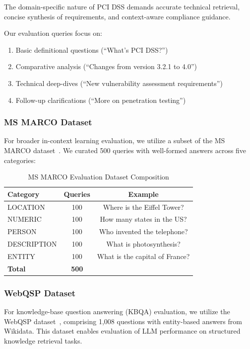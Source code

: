 The domain-specific nature of PCI DSS demands accurate technical retrieval, concise synthesis of requirements, and context-aware compliance guidance.

Our evaluation queries focus on:
\begin{enumerate}[leftmargin=*]
    \item Basic definitional questions (``What's PCI DSS?'')
    \item Comparative analysis (``Changes from version 3.2.1 to 4.0'')
    \item Technical deep-dives (``New vulnerability assessment requirements'')
    \item Follow-up clarifications (``More on penetration testing'')
\end{enumerate}

\subsubsection{MS MARCO Dataset}

For broader in-context learning evaluation, we utilize a subset of the MS MARCO dataset~\cite{bajaj2016msmarco}. We curated 500 queries with well-formed answers across five categories:

\begin{table}[htbp]
\centering
\caption{MS MARCO Evaluation Dataset Composition}
\label{tab:msmarco_dataset}
\begin{tabular}{@{}lcc@{}}
\toprule
\textbf{Category} & \textbf{Queries} & \textbf{Example} \\
\midrule
LOCATION & 100 & Where is the Eiffel Tower? \\
NUMERIC & 100 & How many states in the US? \\
PERSON & 100 & Who invented the telephone? \\
DESCRIPTION & 100 & What is photosynthesis? \\
ENTITY & 100 & What is the capital of France? \\
\midrule
\textbf{Total} & \textbf{500} & \\
\bottomrule
\end{tabular}
\end{table}

\subsubsection{WebQSP Dataset}

For knowledge-base question answering (KBQA) evaluation, we utilize the WebQSP dataset~\cite{yih2016webqsp}, comprising 1,008 questions with entity-based answers from Wikidata. This dataset enables evaluation of LLM performance on structured knowledge retrieval tasks.

